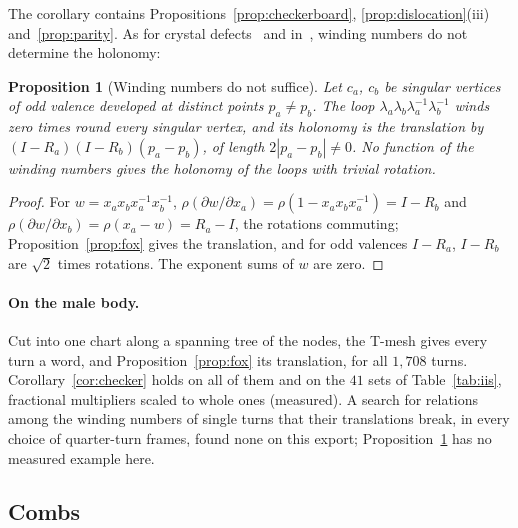 \documentclass[11pt,a4paper]{article}
\newtheorem{proposition}{Proposition}
\newcommand{\lean}[1]{\texttt{\detokenize{#1}}}
\newenvironment{evidence}[3][]{}{}
\begin{document}
The corollary contains Propositions~\ref{prop:checkerboard},
\ref{prop:dislocation}(iii) and~\ref{prop:parity}. As for crystal
defects~\cite{kleman2008disclinations} and in~\cite[\S7]{izmestiev2013torus},
winding numbers do not determine the holonomy:

\begin{evidence}{lean}{\lean{commutator_holonomy}, \lean{winding_numbers_do_not_suffice}}
\begin{proposition}[Winding numbers do not suffice]\label{prop:commutator}
Let $c_a$, $c_b$ be singular vertices of odd valence developed at distinct
points $p_a \neq p_b$. The loop $\lambda_a \lambda_b \lambda_a^{-1}
\lambda_b^{-1}$ winds zero times round every singular vertex, and its holonomy
is the translation by $(I - R_a)(I - R_b)(p_a - p_b)$, of length $2|p_a - p_b|
\neq 0$. No function of the winding numbers gives the holonomy of the loops
with trivial rotation.
\end{proposition}
\end{evidence}

\begin{proof}
For $w = x_a x_b x_a^{-1} x_b^{-1}$, $\rho(\partial w/\partial x_a) = \rho(1 -
x_a x_b x_a^{-1}) = I - R_b$ and $\rho(\partial w/\partial x_b) = \rho(x_a -
w) = R_a - I$, the rotations commuting; Proposition~\ref{prop:fox} gives the
translation, and for odd valences $I - R_a$, $I - R_b$ are $\sqrt2$ times
rotations. The exponent sums of $w$ are zero.
\end{proof}

\paragraph{On the male body.}
Cut into one chart along a spanning tree of the nodes, the T-mesh gives every
turn a word, and Proposition~\ref{prop:fox} its translation, for all
$1{,}708$ turns. Corollary~\ref{cor:checker} holds on all of them and on the
$41$ sets of Table~\ref{tab:iis}, fractional multipliers scaled to whole
ones (measured). A search for relations among the winding numbers of single
turns that their translations break, in every choice of quarter-turn frames,
found none on this export; Proposition~\ref{prop:commutator} has no measured
example here.

\subsection{Combs}\label{sec:combs}
\end{document}
